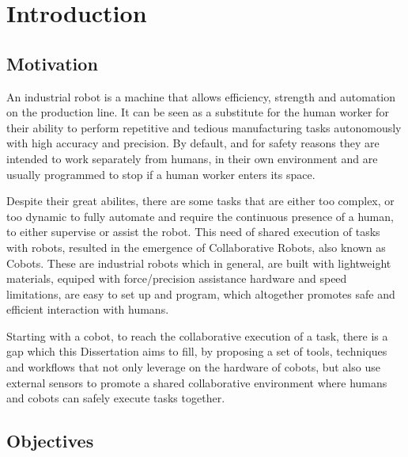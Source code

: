 \chapter{Introduction}
\label{chapter:introduction}



\section{Motivation}

\par An industrial robot is a machine that allows efficiency, strength and automation on the 
production line. It can be seen as a substitute for the human worker for their ability to perform repetitive 
and tedious manufacturing tasks autonomously with high accuracy and precision. By default, and 
for safety reasons they are intended to work separately from humans, in their own environment and 
are usually programmed to stop if a human worker enters its space.

\par Despite their great abilites, there are some tasks that are either too complex, or too dynamic 
to fully automate and require the continuous presence of a human, to either supervise or 
assist the robot. This need of shared execution of tasks with robots, resulted in the 
emergence of Collaborative Robots, also known as Cobots. These are industrial robots which in 
general, are built with lightweight materials, equiped with force/precision assistance hardware 
and speed limitations, are easy to set up and program, which altogether promotes safe and efficient 
interaction with humans.

\par Starting with a cobot, to reach the collaborative execution of a task, there is a gap which this 
Dissertation aims to fill, by proposing a set of tools, techniques and workflows that not only 
leverage on the hardware of cobots, but also use external sensors to promote a shared collaborative 
environment where humans and cobots can safely execute tasks together.

\section{Objectives}

